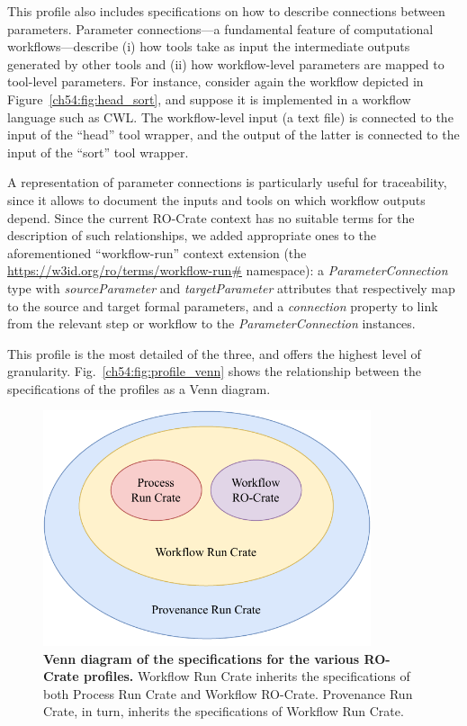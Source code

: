 This profile also includes specifications on how to describe connections between parameters.
Parameter connections---a fundamental feature of computational workflows---describe (i) how tools take as input the intermediate outputs generated by other tools and (ii) how workflow-level parameters are mapped to tool-level parameters.
For instance, consider again the workflow depicted in Figure~\vref{ch54:fig:head_sort},
and suppose it is implemented in a workflow language such as CWL. The workflow-level input (a text file) is connected to the input of the “head” tool wrapper, and the output of the latter is connected to the input of the “sort” tool wrapper.


A representation of parameter connections is particularly useful for traceability, since it allows to document the inputs and tools on which workflow outputs depend.
Since the current RO-Crate context has no suitable terms for the description of such relationships, 
we added appropriate ones to the aforementioned  ``workflow-run'' context extension (the \url{https://w3id.org/ro/terms/workflow-run\#} namespace):
a \emph{ParameterConnection} type with
\emph{sourceParameter} and \emph{targetParameter} attributes that respectively map to the source and target formal parameters, and a
\emph{connection} property to link from the relevant step or workflow to the \emph{ParameterConnection} instances.

This profile is the most detailed of the three, and offers the highest level of granularity. Fig.~\vref{ch54:fig:profile_venn} shows the relationship between the specifications of the profiles as a Venn diagram.

\begin{figure}[htp]
  \centering
  \includegraphics[width=26em]{figures/ch54/wrroc-venn.drawio.pdf}
  \caption[Venn diagram of the specifications for the various RO-Crate profiles]{{\bf Venn diagram of the specifications for the various RO-Crate profiles.}
  Workflow Run Crate inherits the specifications of both Process Run Crate and Workflow RO-Crate. Provenance Run Crate, in turn, inherits the specifications of Workflow Run Crate.}
  \label{ch54:fig:profile_venn}
  \end{figure}


